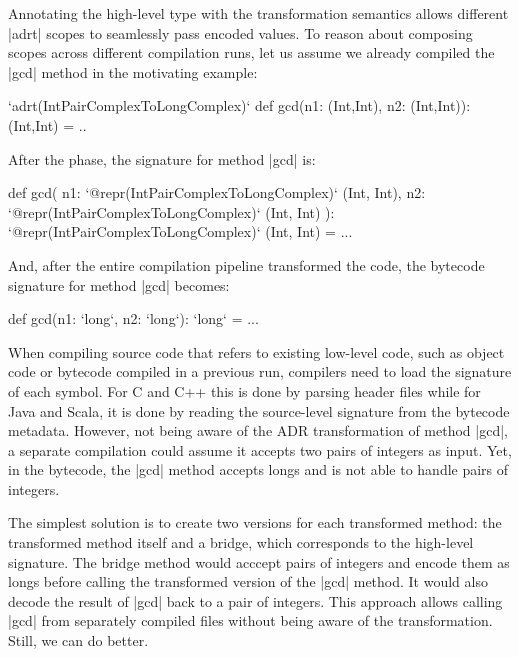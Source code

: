 Annotating the high-level type with the transformation semantics allows different |adrt| scopes to seamlessly pass encoded values. To reason about composing scopes across different compilation runs, let us assume we already compiled the |gcd| method in the motivating example:

\begin{lstlisting-nobreak}
`adrt(IntPairComplexToLongComplex)` {
  def gcd(n1: (Int,Int), n2: (Int,Int)): (Int,Int) = ..
}
\end{lstlisting-nobreak}

After the \inject{} phase, the signature for method |gcd| is:

\begin{lstlisting-nobreak}
def gcd(
    n1: `@repr(IntPairComplexToLongComplex)` (Int, Int),
    n2: `@repr(IntPairComplexToLongComplex)` (Int, Int)
  ): `@repr(IntPairComplexToLongComplex)` (Int, Int) = ...
\end{lstlisting-nobreak}

And, after the entire compilation pipeline transformed the code, the bytecode signature for method |gcd| becomes:

\begin{lstlisting-nobreak}
def gcd(n1: `long`, n2: `long`): `long` = ...
\end{lstlisting-nobreak}

When compiling source code that refers to existing low-level code, such as object code or bytecode compiled in a previous run, compilers need to load the signature of each symbol. For C and C++ this is done by parsing header files while for Java and Scala, it is done by reading the source-level signature from the bytecode metadata. However, not being aware of the ADR transformation of method |gcd|, a separate compilation could assume it accepts two pairs of integers as input. Yet, in the bytecode, the |gcd| method accepts longs and is not able to handle pairs of integers.

The simplest solution is to create two versions for each transformed method: the transformed method itself and a bridge, which corresponds to the high-level signature. The bridge method would acccept pairs of integers and encode them as longs before calling the transformed version of the |gcd| method. It would also decode the result of |gcd| back to a pair of integers. This approach allows calling |gcd| from separately compiled files without being aware of the transformation. Still, we can do better.

